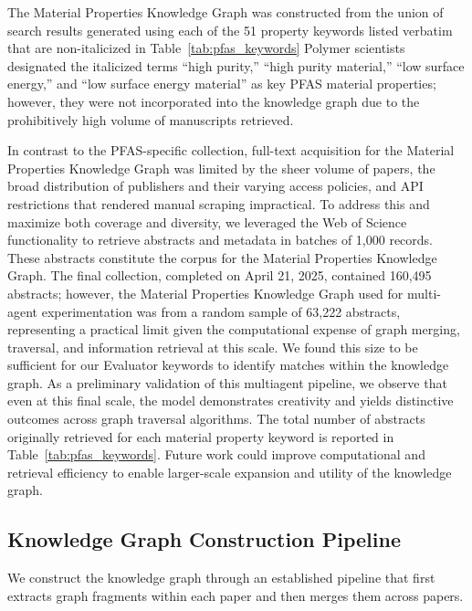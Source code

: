 The Material Properties Knowledge Graph was constructed from the union of search results generated using each of the 51 property keywords listed verbatim that are non-italicized in Table~\ref{tab:pfas_keywords} Polymer scientists designated the italicized terms “high purity,” “high purity material,” “low surface energy,” and “low surface energy material” as key PFAS material properties; however, they were not incorporated into the knowledge graph due to the prohibitively high volume of manuscripts retrieved.

In contrast to the PFAS-specific collection, full-text acquisition for the Material Properties Knowledge Graph was limited by the sheer volume of papers, the broad distribution of publishers and their varying access policies, and API restrictions that rendered manual scraping impractical. To address this and maximize both coverage and diversity, we leveraged the Web of Science functionality to retrieve abstracts and metadata in batches of 1,000 records. These abstracts constitute the corpus for the Material Properties Knowledge Graph. The final collection, completed on April 21, 2025, contained 160,495 abstracts; however, the Material Properties Knowledge Graph used for multi-agent experimentation was from a random sample of 63,222 abstracts, representing a practical limit given the computational expense of graph merging, traversal, and information retrieval at this scale. We found this size to be sufficient for our Evaluator keywords to identify matches within the knowledge graph. As a preliminary validation of this multiagent pipeline, we observe that even at this final scale, the model demonstrates creativity and yields distinctive outcomes across graph traversal algorithms. The total number of abstracts originally retrieved for each material property keyword is reported in Table~\ref{tab:pfas_keywords}. Future work could improve computational and retrieval efficiency to enable larger-scale expansion and utility of the knowledge graph.

\subsection{Knowledge Graph Construction Pipeline}

We construct the knowledge graph through an established pipeline \cite{buehler_accelerating_2024} that first extracts graph fragments within each paper and then merges them across papers.

